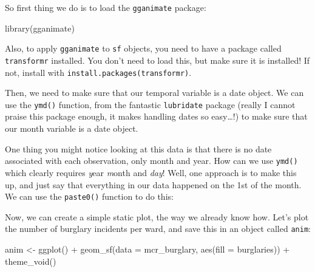 \documentclass[
  krantz2]{krantz}
\makeatletter
\newenvironment{Shaded}{\begin{snugshade}}{\end{snugshade}}
\newcommand{\AttributeTok}[1]{\textcolor[rgb]{0.61,0.61,0.61}{#1}}
\newcommand{\FunctionTok}[1]{\textcolor[rgb]{0,0,0}{#1}}
\newcommand{\NormalTok}[1]{#1}
\newcommand{\OtherTok}[1]{\textcolor[rgb]{0.37,0.37,0.37}{#1}}
\newcommand{\SpecialCharTok}[1]{\textcolor[rgb]{0,0,0}{#1}}
\newcommand{\StringTok}[1]{\textcolor[rgb]{0.5,0.5,0.5}{#1}}
\newenvironment{kframe}{%
\medskip{}
\setlength{\fboxsep}{.8em}
 \def\at@end@of@kframe{}%
 \ifinner\ifhmode%
  \def\at@end@of@kframe{\end{minipage}}%
  \begin{minipage}{\columnwidth}%
 \fi\fi%
 \def\FrameCommand##1{\hskip\@totalleftmargin \hskip-\fboxsep
 \colorbox{shadecolor}{##1}\hskip-\fboxsep
     \hskip-\linewidth \hskip-\@totalleftmargin \hskip\columnwidth}%
 \MakeFramed {\advance\hsize-\width
   \@totalleftmargin\z@ \linewidth\hsize
   \@setminipage}}%
 {\par\unskip\endMakeFramed%
 \at@end@of@kframe}
\renewenvironment{Shaded}{\begin{kframe}}{\end{kframe}}
\makeatother
\begin{document}
So first thing we do is to load the \texttt{gganimate} package:

\begin{Shaded}
\begin{Highlighting}[]
\FunctionTok{library}\NormalTok{(gganimate)}
\end{Highlighting}
\end{Shaded}

Also, to apply \texttt{gganimate} to \texttt{sf} objects, you need to have a package called \texttt{transformr} installed. You don't need to load this, but make sure it is installed! If not, install with \texttt{install.packages(transformr)}.

Then, we need to make sure that our temporal variable is a date object. We can use the \texttt{ymd()} function, from the fantastic \texttt{lubridate} package (really I cannot praise this package enough, it makes handling dates so easy\ldots!) to make sure that our month variable is a date object.

One thing you might notice looking at this data is that there is no date associated with each observation, only month and year. How can we use \texttt{ymd()} which clearly requires \emph{y}ear \emph{m}onth and \emph{day}! Well, one approach is to make this up, and just say that everything in our data happened on the 1st of the month. We can use the \texttt{paste0()} function to do this:

\begin{Shaded}
\end{Shaded}

Now, we can create a simple static plot, the way we already know how. Let's plot the number of burglary incidents per ward, and save this in an object called \texttt{anim}:

\begin{Shaded}
\begin{Highlighting}[]
\NormalTok{anim }\OtherTok{\textless{}{-}} \FunctionTok{ggplot}\NormalTok{() }\SpecialCharTok{+}
  \FunctionTok{geom\_sf}\NormalTok{(}\AttributeTok{data =}\NormalTok{ mcr\_burglary, }
          \FunctionTok{aes}\NormalTok{(}\AttributeTok{fill =}\NormalTok{ burglaries)) }\SpecialCharTok{+} 
  \FunctionTok{theme\_void}\NormalTok{()}
\end{Highlighting}
\end{Shaded}
\end{document}
